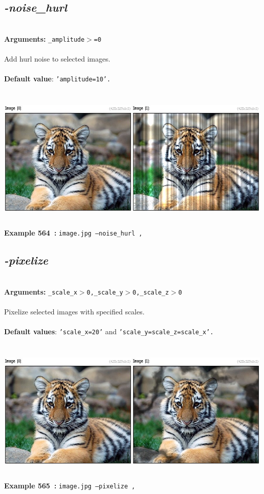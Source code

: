 \documentclass[a4paper,11pt,twoside]{book}
\begin{document}
\subsection{\emph{-noise\_hurl} }\vspace*{-0.5em}
~\\\textbf{Arguments: } 
{\small \texttt{\_amplitude$>$=0}}\\~\\
Add hurl noise to selected images.
~\\~\\\textbf{Default value}: {\small \texttt{'amplitude=10'.}}
\begin{center}\includegraphics[keepaspectratio=true,height=7cm,width=\textwidth]{img/gmic_def564.jpg}\\
{\footnotesize \textbf{Example 564~:} \texttt{image.jpg --noise\_hurl ,}}
\end{center}

\subsection{\emph{-pixelize} }\vspace*{-0.5em}
~\\\textbf{Arguments: } 
{\small \texttt{\_scale\_x$>$0,\_scale\_y$>$0,\_scale\_z$>$0}}\\~\\
Pixelize selected images with specified scales.
~\\~\\\textbf{Default values}: {\small \texttt{'scale\_x=20'} and \texttt{'scale\_y=scale\_z=scale\_x'.}}
\begin{center}\includegraphics[keepaspectratio=true,height=7cm,width=\textwidth]{img/gmic_def565.jpg}\\
{\footnotesize \textbf{Example 565~:} \texttt{image.jpg --pixelize ,}}
\end{center}
\end{document}
